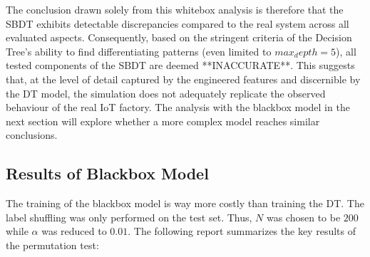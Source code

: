 The conclusion drawn solely from this whitebox analysis is therefore that the SBDT exhibits detectable discrepancies compared to the real system across all evaluated aspects. Consequently, based on the stringent criteria of the Decision Tree's ability to find differentiating patterns (even limited to $max_depth=5$), all tested components of the SBDT are deemed **INACCURATE**. This suggests that, at the level of detail captured by the engineered features and discernible by the DT model, the simulation does not adequately replicate the observed behaviour of the real IoT factory. The analysis with the blackbox model in the next section will explore whether a more complex model reaches similar conclusions.

\subsection*{Results of Blackbox Model}
The training of the blackbox model is way more costly than training the DT. The label shuffling was only performed on the test set. Thus, $N$ was chosen to be $200$ while $\alpha$ was reduced to $0.01$. The following report summarizes the key results of the permutation test:
